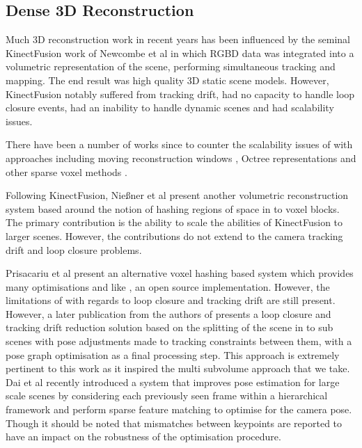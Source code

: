 \subsection{Dense 3D Reconstruction}
Much 3D reconstruction work in recent years has been influenced by the seminal KinectFusion work \cite{Newcombe2011} of Newcombe et al in which
RGBD data was integrated into a volumetric representation of the scene, performing simultaneous tracking and mapping. The end result was
high quality 3D static scene models. 
However, KinectFusion notably suffered from tracking drift, had no capacity to handle loop closure events, had an inability to handle dynamic scenes 
and had scalability issues.

There have been a number of works since to counter the scalability issues of \cite{Newcombe2011} with approaches including moving reconstruction 
windows \cite{Roth2012, Whelan2012}, Octree representations \cite{Zeng2012} and other sparse voxel methods \cite{Prisacariu2014, Chen2013}.

Following KinectFusion, Nie{\ss}ner et al present another volumetric reconstruction system \cite{Niessner2013} based around the notion of
hashing regions of space in to voxel blocks. The primary contribution is the ability to scale the abilities of KinectFusion to larger
scenes. However, the contributions do not extend to the camera tracking drift and loop closure problems.

Prisacariu et al present an alternative voxel hashing based system \cite{Prisacariu2014} which provides many optimisations and like \cite{Niessner2013}, an open source 
implementation. However, the limitations of \cite{Newcombe2011,Niessner2013} with regards to loop closure and tracking drift are still present. 
However, a later publication \cite{Kahler2016} from the authors of \cite{Prisacariu2014} presents a loop closure and tracking drift reduction 
solution based on the splitting of the scene in to sub scenes with pose adjustments made to tracking constraints between them, with 
a pose graph optimisation as a final processing step. This approach is extremely pertinent to this work as it inspired the multi subvolume approach 
that we take. Dai et al \cite{dai2016bundlefusion} recently introduced a system that improves pose estimation for large scale scenes by considering each previously seen 
frame within a hierarchical framework and perform sparse feature matching to optimise for the camera pose. Though it should be noted that mismatches between keypoints are 
reported to have an impact on the robustness of the optimisation procedure.

